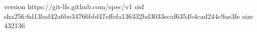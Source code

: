 version https://git-lfs.github.com/spec/v1
oid sha256:6d13baf42a6be34766bbf47effefa136332bd3033ecaf6354b4cad244c9ae3fe
size 432136
